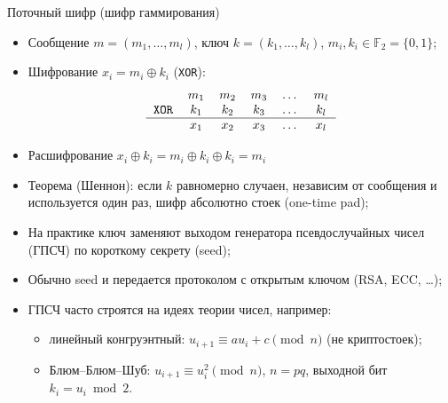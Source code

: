 \documentclass[serif, aspectratio=169]{beamer}
\begin{document}
\begin{frame}{Поточный шифр (шифр гаммирования)}
    \begin{itemize}
        \item Сообщение $m=(m_1,\dots,m_l)$, ключ $k=(k_1,\dots,k_l)$, $m_i,k_i\in\mathbb{F}_2=\{0,1\}$;
        \item Шифрование $x_i=m_i\oplus k_i$  (\texttt{XOR}):
        \begin{equation*}
        \begin{tabular}{cccccc} 
          & $m_1$ & $m_2$ & $m_3$ & \dots & $m_l$ \\
         \texttt{XOR}
         & $k_1$ & $k_2$ & $k_3$ & \dots & $k_l$ \\
        \hline
         & $x_1$ & $x_2$ & $x_3$ & \dots & $x_l$ \\
        \end{tabular}
        \end{equation*}
        \item Расшифрование $x_i\oplus k_i=m_i\oplus k_i\oplus k_i=m_i$
        \item Теорема (Шеннон): если $k$ равномерно случаен, независим от сообщения и используется один раз, шифр абсолютно стоек (one-time pad);
        \item На практике ключ заменяют выходом генератора псевдослучайных чисел (ГПСЧ) по короткому секрету (seed);
        \item Обычно seed и передается протоколом с открытым ключом (RSA, ECC, \dots);
        \item ГПСЧ часто строятся на идеях теории чисел, например:
        \begin{itemize}
            \item линейный конгруэнтный: $u_{i+1}\equiv au_i+c\pmod n$ (не криптостоек);
            \item Блюм--Блюм--Шуб: $u_{i+1}\equiv u_i^2\pmod n$, $n=pq$, выходной бит $k_i=u_i\bmod 2$.
        \end{itemize}
    \end{itemize}

    \note{
        \begin{itemize}
            \item ---
        \end{itemize}
    }
\end{frame}
\end{document}
